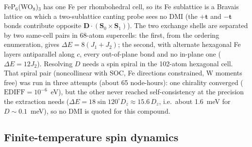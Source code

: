 \documentclass[aps,prb,preprint,superscriptaddress,longbibliography,nofootinbib]{revtex4-2}
\begin{document}
FeP$_6$(WO$_8$)$_3$ has one Fe per rhombohedral cell, so its Fe sublattice is a Bravais lattice on which a
two-sublattice canting probe sees no DMI (the $+\mathbf{t}$ and $-\mathbf{t}$ bonds contribute opposite
$\mathbf{D}\cdot(\mathbf{S}_0\times\mathbf{S}_1)$). The two exchange shells are separated by two same-cell
pairs in 68-atom supercells: the first, from the ordering enumeration, gives $\Delta E=8(J_1+J_2)$; the
second, with alternate hexagonal Fe layers antiparallel along $c$, every
out-of-plane bond and no in-plane one ($\Delta E=12J_2$). Resolving $D$ needs a spin spiral in the 102-atom
hexagonal cell. That spiral pair (noncollinear with SOC, Fe directions constrained, W moments free) was run in
three attempts (about 65 node-hours): one chirality converged ($\mathrm{EDIFF}=10^{-6}$~eV), but the other
never reached self-consistency at the precision the extraction needs ($\Delta E=18\sin120^\circ
D_z\approx15.6\,D_z$, i.e.\ about 1.6~meV for $D\sim0.1$~meV), so no DMI is quoted for this compound.

\subsection*{Finite-temperature spin dynamics}
\end{document}
